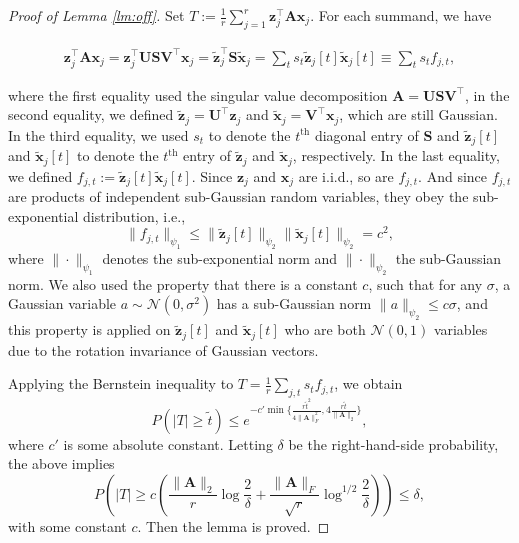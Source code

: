 \documentclass[10pt]{article}
\newcommand{\B}{\mathbf}
\begin{document}
\begin{proof}[Proof of Lemma \ref{lm:off}]
Set $T:= \frac{1}{r} \sum\limits_{j=1}^{r} \B{z}_j^{\top}\B{A}\B{x}_j $. For each summand, we have

\begin{align}
\B{z}_j^{\top}\B{A}\B{x}_j = \B{z}_j^{\top}\B{U}\B{S}\B{V}^{\top}\B{x}_j = \tilde{\B{z}}_j^{\top}\B{S}\tilde{\B{x}}_j = \sum_t s_t \tilde{\B{z}}_j[t]\tilde{\B{x}}_j[t] \equiv \sum_t s_tf_{j,t},
\end{align}

where the first equality used the singular value decomposition $\B{A}=\B{U}\B{S}\B{V}^{\top}$, in the second equality, we defined $\tilde{\B{z}}_j = \B{U}^{\top}\B{z}_j$ and $\tilde{\B{x}}_j = \B{V}^{\top} \B{x}_j$, which are still Gaussian. In the third equality, we used $s_t$ to denote the $t^\text{th}$ diagonal entry of $\B{S}$ and $\tilde{\B{z}}_j[t]$ and $\tilde{\B{x}}_j[t]$ to denote the $t^\text{th}$ entry of $\tilde{\B{z}}_j$ and $\tilde{\B{x}}_j$, respectively. In the last equality, we defined $f_{j,t}:=\tilde{\B{z}}_j[t]\tilde{\B{x}}_j[t]$.
Since $\B{z}_j$ and $\B{x}_j$ are i.i.d., so are $f_{j,t}$. And since $f_{j,t}$ are products of independent sub-Gaussian random variables, they obey the sub-exponential distribution, i.e.,
\[
\|f_{j,t}\|_{\psi_1} \leq \|\tilde{\B{z}}_j[t]\|_{\psi_2}\|\tilde{\B{x}}_j[t]\|_{\psi_2} =c^2,
\]
where $\|\cdot\|_{\psi_1} $ denotes the sub-exponential norm and $\|\cdot\|_{\psi_2} $ the sub-Gaussian norm. We also used the property that there is a constant $c$, such that for any $\sigma$, a Gaussian variable $a\sim \mathcal{N}(0,\sigma^2)$ has a sub-Gaussian norm $\|a\|_{\psi_2}\leq c\sigma$, and this property is applied on $\tilde{\B{z}}_j[t]$ and $\tilde{\B{x}}_j[t]$ who are both $\mathcal{N}(0,1)$ variables due to the rotation invariance of Gaussian vectors.

Applying the Bernstein inequality \citep{vershynin2018high} to $T= \frac{1}{r}\sum_{j,t} s_t f_{j,t} $, we obtain
\[
 P(| T| \geq \tilde{t}) \leq e^{-c'\min\{ \frac{r\tilde{t}^2}{4\|\B{A}\|_F^2}, 4\frac{r\tilde{t}}{ \|\B{A}\|_2}\}},
\]
where $c'$ is some absolute constant.
Letting $\delta$ be the right-hand-side probability, the above implies
\[
 P\left(| T| \geq c \left( \frac{\|\B{A}\|_2}{r}\log \frac{2}{\delta} + \frac{\|\B{A}\|_F}{\sqrt r}\log^{1/2} \frac{2}{\delta}\right)\right) \leq \delta,
\]
with some constant $c$. Then the lemma is proved.
\end{proof}
\end{document}
